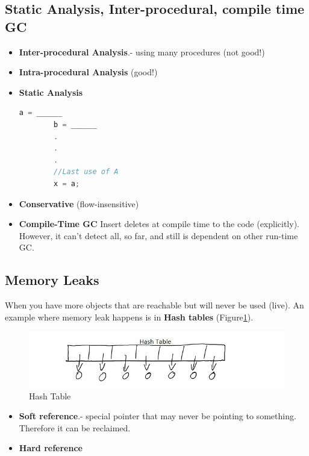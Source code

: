 \documentclass[twoside]{article}
\begin{document}
\subsection{Static Analysis, Inter-procedural, compile time GC}
\begin{itemize}
	\item \textbf{Inter-procedural Analysis}.- using many procedures (not good!)

	\item \textbf{Intra-procedural Analysis} (good!)
	
	\item \textbf{Static Analysis} 
		
		\begin{lstlisting}[language=C++]
		a = ______
		b = ______
		.
		.
		.
		//Last use of A
		x = a;
		\end{lstlisting}

	\item \textbf{Conservative} (flow-insensitive)
	
	\item \textbf{Compile-Time GC} Insert deletes at compile time to the code (explicitly). However, it can't detect all, so far, and still is dependent on other run-time GC.
	
\end{itemize}

\subsection{Memory Leaks}

When you have more objects that are reachable but will never be used (live). An example where memory leak happens is in \textbf{Hash tables} (Figure\ref{hashTable}).

\begin{figure}[ht!]
\center
\includegraphics[width=150mm]{Hash_Table.jpg}
\caption{Hash Table \label{hashTable}}
\end{figure}

\begin{itemize}
	\item \textbf{Soft reference}.- special pointer that may never be pointing to something. Therefore it can be reclaimed.

	\item \textbf{Hard reference} 
\end{itemize}
\end{document}
